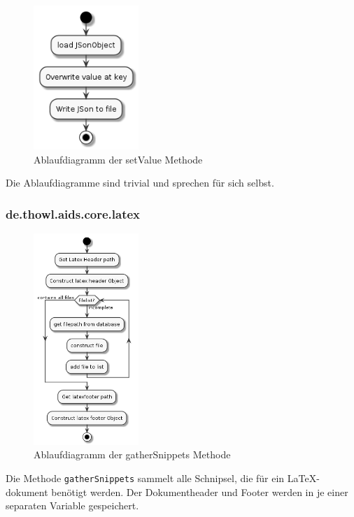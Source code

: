 \documentclass[stu, a4paper, 11pt, floatsintext]{apa7}
\begin{document}
\begin{figure}[!htbp]
\centering
\includegraphics[width=150px]{../technical_documentation/diagramm/uml/flowcharts/core/json/setValue.png}
\caption{\label{setValue-methode}Ablaufdiagramm der setValue Methode}
\end{figure}

\noindent Die Ablaufdiagramme sind trivial und sprechen für sich selbst.

\subsubsection{de.thowl.aids.core.latex}

\begin{figure}[!htbp]
\centering
\includegraphics[width=150px]{../technical_documentation/diagramm/uml/flowcharts/core/latex/gatherSnippets.png}
\caption{\label{gatherSnippets-methode}Ablaufdiagramm der gatherSnippets Methode}
\end{figure}

\noindent Die Methode \texttt{gatherSnippets} sammelt alle Schnipsel, die für ein \LaTeX{}-dokument benötigt werden.
Der Dokumentheader und Footer werden in je einer separaten Variable gespeichert.
\end{document}
